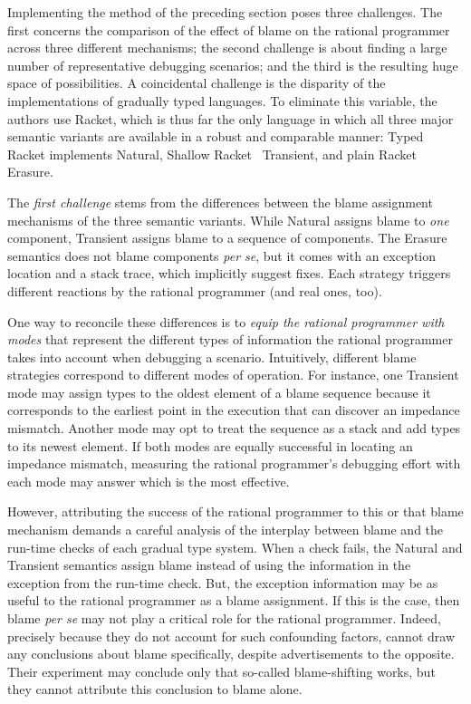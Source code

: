 
Implementing the method of the preceding section poses three challenges.  The
first concerns the comparison of the effect of blame on the rational programmer
across three different mechanisms; the second challenge is about finding a large
number of representative debugging scenarios; and the third is the resulting
huge space of possibilities. A coincidental challenge is the disparity of the
implementations of gradually typed languages. To eliminate this variable, the
authors use Racket, which is thus far the only language in which all three major
semantic variants are available in a robust and comparable manner: Typed Racket
implements Natural, Shallow Racket~\citep{ttt21} Transient, and plain Racket
Erasure.

The {\em first challenge\/} stems from the differences between the blame
assignment mechanisms of the three semantic variants.  While Natural assigns
blame to {\em one\/} component, Transient assigns blame to a sequence of
components. The Erasure semantics does not blame components {\it per se\/}, but
it comes with an exception location and a stack trace, which implicitly suggest
fixes.  Each strategy triggers different reactions by the rational programmer
(and real ones, too).

One way to reconcile these differences is to {\em equip the rational
programmer with modes \/} that represent the different types of
information the rational programmer takes into account when debugging a
scenario. Intuitively, different
blame strategies correspond to different modes of operation.
For instance, one Transient mode may assign types to the oldest element of a
blame sequence because it corresponds to the
earliest point in the execution that can discover an impedance
mismatch.  Another mode may opt to treat the sequence as a stack and add
types to its newest element.  If both modes are equally successful in
locating an impedance mismatch, measuring the rational programmer's debugging effort with each mode
may answer which is the most effective.

However, attributing the success of the rational programmer to this or
that blame mechanism demands a careful analysis of the interplay between blame
and the run-time checks of each gradual type system. When a check fails,
the Natural and Transient semantics assign blame instead of using the
information in the exception from the run-time check. But, the
exception information may be as useful to the rational
programmer as a blame assignment. If this is the case, then blame {\em per se\/} may not play a critical
role for the rational programmer. Indeed, precisely because they do not
account for such confounding factors, \citet{lksfd-popl-2020} cannot draw any
conclusions about blame specifically, despite advertisements to the
opposite. Their experiment may conclude only that so-called blame-shifting
works, but they cannot attribute this conclusion to blame alone. 


